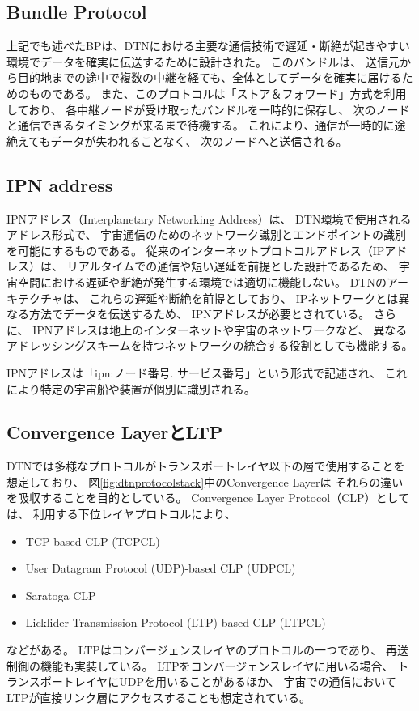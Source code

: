 \subsection{Bundle Protocol}
\label{subsection:Bundle Protocol}
上記でも述べたBPは、DTNにおける主要な通信技術で遅延・断絶が起きやすい環境でデータを確実に伝送するために設計された。
このバンドルは、 送信元から目的地までの途中で複数の中継を経ても、全体としてデータを確実に届けるためのものである。 
また、このプロトコルは「ストア＆フォワード」方式を利用しており、 各中継ノードが受け取ったバンドルを一時的に保存し、 
次のノードと通信できるタイミングが来るまで待機する。 これにより、通信が一時的に途絶えてもデータが失われることなく、 次のノードへと送信される。

\subsection{IPN address}
\label{subsection:IPN address}
IPNアドレス（Interplanetary Networking Address）は、 DTN環境で使用されるアドレス形式で、
宇宙通信のためのネットワーク識別とエンドポイントの識別を可能にするものである。 従来のインターネットプロトコルアドレス（IPアドレス）は、
リアルタイムでの通信や短い遅延を前提とした設計であるため、 宇宙空間における遅延や断絶が発生する環境では適切に機能しない。
DTNのアーキテクチャは、 これらの遅延や断絶を前提としており、 IPネットワークとは異なる方法でデータを伝送するため、
IPNアドレスが必要とされている。 さらに、 IPNアドレスは地上のインターネットや宇宙のネットワークなど、
異なるアドレッシングスキームを持つネットワークの統合する役割としても機能する。

IPNアドレスは「ipn:ノード番号. サービス番号」という形式で記述され、 これにより特定の宇宙船や装置が個別に識別される。 

\subsection{Convergence LayerとLTP}
\label{subsection:Convergence LayerとLTP}
DTNでは多様なプロトコルがトランスポートレイヤ以下の層で使用することを想定しており、 図\ref{fig:dtnprotocolstack}中のConvergence Layerは
それらの違いを吸収することを目的としている。 Convergence Layer Protocol（CLP）としては、 
利用する下位レイヤプロトコルにより、
\begin{itemize}
    \item TCP-based CLP (TCPCL)
    \item User Datagram Protocol (UDP)-based CLP (UDPCL)
    \item Saratoga CLP
    \item Licklider Transmission Protocol (LTP)-based CLP (LTPCL)
\end{itemize}
などがある。
LTP\cite{rfc5326}はコンバージェンスレイヤのプロトコルの一つであり、 再送制御の機能も実装している。
LTPをコンバージェンスレイヤに用いる場合、 トランスポートレイヤにUDPを用いることがあるほか、 
宇宙での通信においてLTPが直接リンク層にアクセスすることも想定されている。
